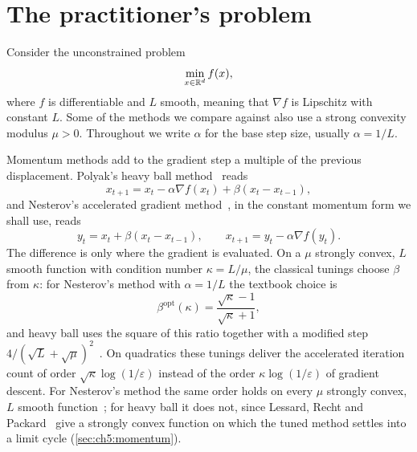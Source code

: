 \section{The practitioner's problem}\label{sec:ch6:problem}

Consider the unconstrained problem
\begin{equation}\label{eq:ch6:problem}
  \min_{x\in\mathbb{R}^d} f(x),
\end{equation}
where $f$ is differentiable and $L$ smooth, meaning that $\nabla f$ is
Lipschitz with constant $L$. Some of the methods we compare against also use a
strong convexity modulus $\mu>0$. Throughout we write $\alpha$ for the base step
size, usually $\alpha=1/L$.

Momentum methods add to the gradient step a multiple of the previous
displacement. Polyak's heavy ball method~\cite{polyak1964} reads
\begin{equation}\label{eq:ch6:hb}
  x_{t+1} = x_t - \alpha\nabla f(x_t) + \beta(x_t-x_{t-1}),
\end{equation}
and Nesterov's accelerated gradient method~\cite{nesterov1983}, in the
constant momentum form we shall use, reads
\begin{equation}\label{eq:ch6:nag}
  y_t = x_t + \beta(x_t-x_{t-1}),\qquad x_{t+1} = y_t - \alpha\nabla f(y_t).
\end{equation}
The difference is only where the gradient is evaluated. On a $\mu$ strongly
convex, $L$ smooth function with condition number $\kappa=L/\mu$, the classical
tunings choose $\beta$ from $\kappa$: for Nesterov's method with $\alpha=1/L$
the textbook choice is
\begin{equation}\label{eq:ch6:betaopt}
  \beta^{\mathrm{opt}}(\kappa) = \frac{\sqrt\kappa-1}{\sqrt\kappa+1},
\end{equation}
and heavy ball uses the square of this ratio together with a modified step
$4/(\sqrt L+\sqrt\mu)^2$~\cite{polyak1987}.
On quadratics these tunings deliver the accelerated iteration count of order $\sqrt\kappa\log(1/\varepsilon)$ instead of the order $\kappa\log(1/\varepsilon)$ of gradient descent.
For Nesterov's method the same order holds on every $\mu$ strongly convex, $L$ smooth function~\cite{nesterov2004}; for heavy ball it does not, since Lessard, Recht and Packard~\cite{lessard2016} give a strongly convex function on which the tuned method settles into a limit cycle (\cref{sec:ch5:momentum}).

